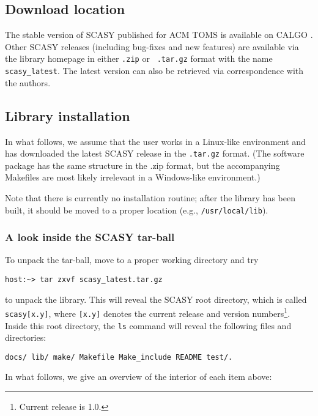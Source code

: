\documentclass[11pt]{article}
\begin{document}
\subsection{Download location}
\label{sec:download} The stable version of SCASY published for ACM TOMS
is available on CALGO \cite{CALGO}. Other SCASY releases (including bug-fixes and new features) are available via the library homepage \cite{scasy} in either {\tt .zip} or {\tt
.tar.gz} format with the name \texttt{scasy\_latest}. The latest version can also
be retrieved via correspondence with the authors.

\subsection{Library installation} \label{sec:usage}
In what follows, we assume that the user works in a Linux-like
environment and has downloaded the latest SCASY release in the
{\tt .tar.gz} format. (The software package has the same structure
in the {.zip} format, but the accompanying Makefiles are most
likely irrelevant in a Windows-like environment.)

Note that there is currently no installation routine; after the
library has been built, it should be moved to a proper location
(e.g., \texttt{/usr/local/lib}).

\subsubsection{A look inside the SCASY tar-ball}
To unpack the tar-ball, move to a proper working directory and try
%
\begin{verbatim}
host:~> tar zxvf scasy_latest.tar.gz
\end{verbatim}
%
to unpack the library. This will reveal the SCASY root directory,
which is called \texttt{scasy[x.y]}, where \texttt{[x.y]} denotes
the current release and version numbers\footnote{Current release
is 1.0.}. Inside this root directory, the \texttt{ls} command will
reveal the following files and directories:
%
\begin{verbatim}
docs/ lib/ make/ Makefile Make_include README test/.
\end{verbatim}
%
In what follows, we give an overview of the interior of each item
above:
\end{document}
